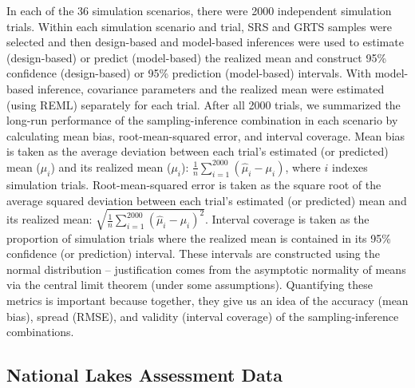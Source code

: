 \documentclass[]{elsarticle} %
\begin{document}
In each of the 36 simulation scenarios, there were 2000 independent
simulation trials. Within each simulation scenario and trial, SRS and
GRTS samples were selected and then design-based and model-based
inferences were used to estimate (design-based) or predict (model-based)
the realized mean and construct 95\% confidence (design-based) or 95\%
prediction (model-based) intervals. With model-based inference,
covariance parameters and the realized mean were estimated (using REML)
separately for each trial. After all 2000 trials, we summarized the
long-run performance of the sampling-inference combination in each
scenario by calculating mean bias, root-mean-squared error, and interval
coverage. Mean bias is taken as the average deviation between each
trial's estimated (or predicted) mean (\(\hat{\mu}_i\)) and its realized
mean (\(\mu_i\)):
\(\frac{1}{n}\sum_{i = 1}^{2000} (\hat{\mu}_i - \mu_i)\), where \(i\)
indexes simulation trials. Root-mean-squared error is taken as the
square root of the average squared deviation between each trial's
estimated (or predicted) mean and its realized mean:
\(\sqrt{\frac{1}{n}\sum_{i = 1}^{2000} (\hat{\mu}_i - \mu_i)^2}\).
Interval coverage is taken as the proportion of simulation trials where
the realized mean is contained in its 95\% confidence (or prediction)
interval. These intervals are constructed using the normal distribution
-- justification comes from the asymptotic normality of means via the
central limit theorem (under some assumptions). Quantifying these
metrics is important because together, they give us an idea of the
accuracy (mean bias), spread (RMSE), and validity (interval coverage) of
the sampling-inference combinations.

\hypertarget{sec:mm_app}{%
\subsection{National Lakes Assessment Data}\label{sec:mm_app}}
\end{document}
